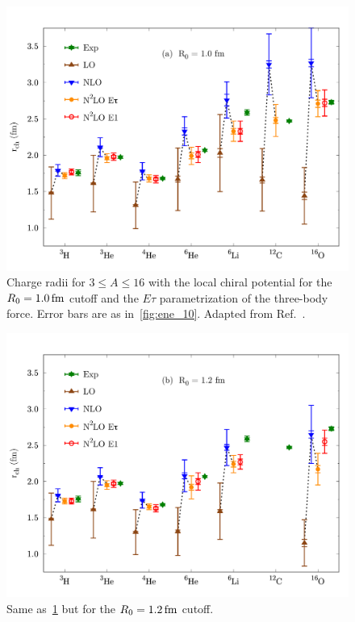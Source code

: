 \documentclass[aps,prc,twocolumn,superscriptaddress,floatfix]{revtex4-1}
\begin{document}
\begin{figure}[htb]
\includegraphics[width=\linewidth]{rch_10.pdf}
\caption[]{Charge radii for $3\le A\le16$ with the local chiral potential 
for the $R_0=1.0\,\rm fm$ cutoff and the $E\tau$ parametrization of the three-body force. 
Error bars are as in~\cref{fig:ene_10}. Adapted from Ref.~\cite{Lonardoni:2017afdmc}.}
\label{fig:rch_10}
\end{figure}

\begin{figure}[htb]
\includegraphics[width=\linewidth]{rch_12.pdf}
\caption[]{Same as~\cref{fig:rch_10} but for the $R_0=1.2\,\rm fm$ cutoff.}
\label{fig:rch_12}
\end{figure}
\end{document}
